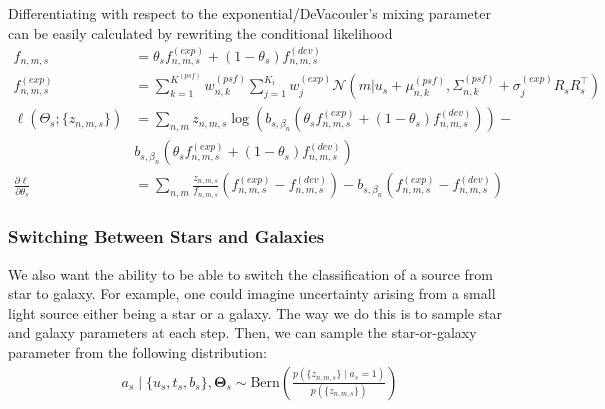 \documentclass[11pt]{article}
\newcommand{\trans}{\intercal}
\begin{document}
Differentiating with respect to the exponential/DeVacouler's mixing parameter can be easily calculated by rewriting the conditional likelihood
\begin{align}
  f_{n,m,s} &= \theta_s f^{(exp)}_{n,m,s} + (1 - \theta_s) f^{(dev)}_{n,m,s} \\
  f^{(exp)}_{n,m,s} 
    &= \sum_{k=1}^{K^{(psf)}} w_{n,k}^{(psf)} \sum_{j=1}^{K_i} w_j^{(exp)} \mathcal{N} \left(m | u_s + \mu^{(psf)}_{n,k}, \Sigma^{(psf)}_{n,k} + \sigma_j^{(exp)} R_s R_s^\trans \right) \\
  \ell(\Theta_s; \{z_{n,m,s}\}) 
    &= \sum_{n,m} z_{n,m,s} \log\left( b_{s, \beta_n} (\theta_s f^{(exp)}_{n,m,s} + (1 - \theta_s) f^{(dev)}_{n,m,s})\right) - \\
    & b_{s, \beta_n} (\theta_s f^{(exp)}_{n,m,s} + (1 - \theta_s) f^{(dev)}_{n,m,s})  \\ 
  \frac{\partial \ell}{\partial \theta_s} 
    &= \sum_{n,m} \frac{z_{n,m,s}}{f_{n,m,s}} \left(f^{(exp)}_{n,m,s} - f^{(dev)}_{n,m,s}\right) -
       b_{s,\beta_n} \left(f^{(exp)}_{n,m,s} - f^{(dev)}_{n,m,s}\right)
\end{align}

\subsubsection{Switching Between Stars and Galaxies}

We also want the ability to be able to switch the classification of a source from
star to galaxy. For example, one could imagine uncertainty arising
from a small light source either being a star or a galaxy. The way we do this
is to sample star and galaxy parameters at each step. Then, we can sample
the star-or-galaxy parameter from the following distribution:
\begin{align}
a_s \mid \{u_s, t_s, b_s\}, \mathbf{\Theta}_s \sim \text{Bern}\left(\frac{p(\{z_{n,m,s}\} \mid a_s = 1)}{p(\{z_{n,m,s}\})}\right)
\end{align}
\end{document}
